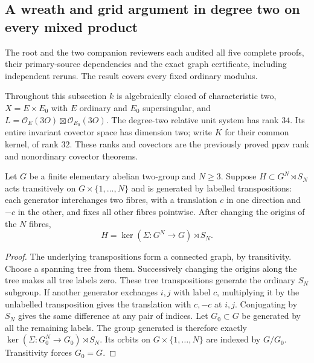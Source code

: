 \subsection{A wreath and grid argument in degree two on every mixed product}
\label{subsec:mixed-degree-two-wreath-grid-candidate}
The root and the two companion reviewers each audited all five complete
proofs, their primary-source dependencies and the exact graph certificate,
including independent reruns. The result covers every fixed ordinary modulus.

Throughout this subsection $k$ is algebraically closed of characteristic
two, $X=E\times E_0$ with $E$ ordinary and $E_0$ supersingular, and
$L=\mathcal O_E(3O)\boxtimes\mathcal O_{E_0}(3O)$.
The degree-two relative unit system has rank $34$. Its entire invariant
covector space has dimension two; write $K$ for their common kernel,
of rank $32$. These ranks and covectors are the previously proved
ppav rank and nonordinary covector theorems.

\begin{lemma}
\label{lem:labelled-transposition-wreath-candidate}
Let $G$ be a finite elementary abelian two-group and $N\ge3$.
Suppose $H\subset G^N\rtimes S_N$ acts transitively on
$G\times\{1,\ldots,N\}$ and is generated by labelled transpositions:
each generator interchanges two fibres, with a translation $c$ in
one direction and $-c$ in the other, and fixes all other fibres
pointwise. After changing the origins of the $N$ fibres,
\[
                   H=\ker(\Sigma:G^N\to G)\rtimes S_N.
\]
\end{lemma}
\begin{proof}
The underlying transpositions form a connected graph, by transitivity.
Choose a spanning tree from them. Successively changing the origins
along the tree makes all tree labels zero. These tree transpositions
generate the ordinary $S_N$ subgroup. If another generator exchanges
$i,j$ with label $c$, multiplying it by the unlabelled transposition
gives the translation with $c,-c$ at $i,j$. Conjugating by $S_N$
gives the same difference at any pair of indices.
Let $G_0\subset G$ be generated by all the remaining labels. The
group generated is therefore exactly
$\ker(\Sigma:G_0^N\to G_0)\rtimes S_N$.
Its orbits on $G\times\{1,\ldots,N\}$ are indexed by $G/G_0$.
Transitivity forces $G_0=G$.
\end{proof}

